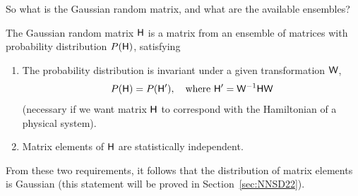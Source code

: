 \documentclass[a4paper,11pt,twoside]{article}
\begin{document}
    So what is the Gaussian random matrix, and what are the available ensembles?
    \begin{theorem}\label{th:GE}
        The Gaussian random matrix $\mathsf{H}$ is a matrix from an ensemble of matrices with probability distribution $P(\mathsf{H})$, satisfying
        \begin{enumerate}
            \item The probability distribution is invariant under a given transformation $\mathsf{W}$,
                \begin{equation}
                    P(\matrix{H})=P(\matrix{H}'),\quad\text{where}\ \matrix{H'}=\matrix{W}^{-1}\matrix{H}\matrix{W}
                \end{equation}
                (necessary if we want matrix $\mathsf{H}$ to correspond with the Hamiltonian of a physical system).
            \item Matrix elements of $\mathsf{H}$ are statistically independent.
        \end{enumerate}
        From these two requirements, it follows that the distribution of matrix elements is Gaussian (this statement will be proved in Section~\ref{sec:NNSD22}).
    \end{theorem}
\end{document}
